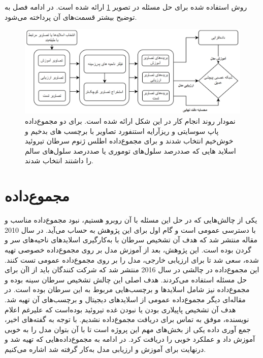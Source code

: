 
روش استفاده شده برای حل مسئله در تصویر \ref{thesis_method_flowchart} ارائه شده است. در ادامه فصل به توضیح بیشتر قسمت‌های آن پرداخته می‌شود.
\begin{figure}
	\begin{center}
		\vspace{0.5cm}
		\includegraphics[width=\linewidth]{figs/suggested_methods/chart.PNG}
	\end{center}
	\caption[نمودار روند انجام کار]{نمودار روند انجام کار در این شکل ارائه شده است.
	برای دو مجموع‌داده پاپ سوسایتی و ریزآرایه استنفورد تصاویر با برچسب های بدخیم و خوش‌خیم انتخاب شدند و برای مجموع‌داده اطلس ژنوم سرطان تیروئید اسلاید هایی که صددرصد سلول‌های توموری یا صددرصد سلول‌های سالم را داشتند انتخاب شدند. }
	\label{thesis_method_flowchart}
\end{figure}

\section{مجموع‌داده}\label{sec:مجموع‌داده}
یکی از چالش‌هایی که در حل این مسئله با آن روبرو هستیم، نبود مجموع‌داده مناسب و با دسترسی عمومی است و گام اول برای این پژوهش به حساب می‌آید.
در سال 2010 مقاله \cite{halicek2019head} منتشر شد که هدف آن تشخیص سرطان با به‌کارگیری اسلاید‌های ناحیه‌های سر و گردن بوده است.
این پژوهش، بعد از آموزش مدل بر روی مجموع‌داده خصوصی تهیه شده، سعی شد تا برای ارزیابی خارجی، مدل را بر روی مجموع‌داده عمومی  تست کنند. این مجموع‌داده در چالشی در سال 2016 منتشر شد که شرکت کنندگان باید از اآن برای حل مسئله استفاده می‌کردند. هدف اصلی این چالش تشخیص سرطان سینه بوده و مجموع‌داده نیز شامل اسلاید‌ها و برچسب‌هایی مربوط به این سرطان بوده است.
در مقاله‌ای دیگر \cite{bohland2021machine} مجموع‌داده عمومی از اسلاید‌های دیجیتال و برچسب‌های آن تهیه شد. هدف آن تشخیص پاپیلاری بودن یا نبودن غده تیروئید بوده‌است که علیرغم اعلام نویسنده، موفق به تماس برای دریافت مجموع‌داده نشدیم.
با توجه به گفته‌های اخیر، جمع آوری داده یکی از بخش‌های مهم این پروژه است تا با آن بتوان مدل را به خوبی آموزش داد و عملکرد خوبی را دریافت کرد.
در ادامه به مجموع‌داده‌هایی که تهیه شد و درنهایت برای آموزش و ارزیابی مدل به‌کار گرفته شد اشاره می‌کنیم.

